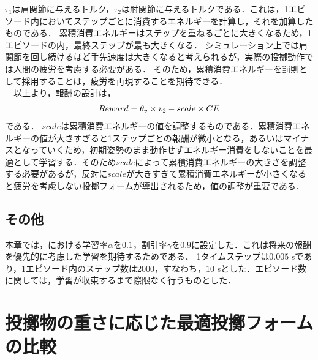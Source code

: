 $\tau_{1}$は肩関節に与えるトルク，$\tau_{2}$は肘関節に与えるトルクである．これは，1エピソード内においてステップごとに消費するエネルギーを計算し，それを加算したものである．
累積消費エネルギーはステップを重ねるごとに大きくなるため，1エピソードの内，最終ステップが最も大きくなる．
シミュレーション上では肩関節を回し続けるほど手先速度は大きくなると考えられるが，実際の投擲動作では人間の疲労を考慮する必要がある．
そのため，累積消費エネルギーを罰則として採用することは，疲労を再現することを期待できる．\\
　以上より，報酬の設計は，
\begin{eqnarray}
  \equlabel{2.26}
  Reward = \theta_{v} \times v_{2} - scale \times CE
\end{eqnarray}
である．
$scale$は累積消費エネルギーの値を調整するものである．累積消費エネルギーの値が大きすぎると1ステップごとの報酬が微小となる，あるいはマイナスとなっていくため，初期姿勢のまま動作せずエネルギー消費をしないことを最適として学習する．そのため$scale$によって累積消費エネルギーの大きさを調整する必要があるが，反対に$scale$が大きすぎて累積消費エネルギーが小さくなると疲労を考慮しない投擲フォームが導出されるため，値の調整が重要である．
\subsection{その他}
本章では，における学習率$\alpha$を$0.1$，割引率$\gamma$を$0.9$に設定した．これは将来の報酬を優先的に考慮した学習を期待するためである．
1タイムステップは$0.005$ sであり，1エピソード内のステップ数は2000，すなわち，$10$ sとした．エピソード数に関しては，学習が収束するまで際限なく行うものとした．
\section{投擲物の重さに応じた最適投擲フォームの比較}
